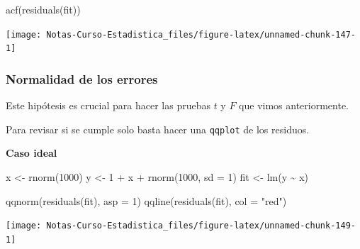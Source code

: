 \documentclass[
  12pt,
]{book}
\newenvironment{Shaded}{\begin{snugshade}}{\end{snugshade}}
\newcommand{\AttributeTok}[1]{\textcolor[rgb]{0.77,0.63,0.00}{#1}}
\newcommand{\DecValTok}[1]{\textcolor[rgb]{0.00,0.00,0.81}{#1}}
\newcommand{\FunctionTok}[1]{\textcolor[rgb]{0.00,0.00,0.00}{#1}}
\newcommand{\NormalTok}[1]{#1}
\newcommand{\OtherTok}[1]{\textcolor[rgb]{0.56,0.35,0.01}{#1}}
\newcommand{\SpecialCharTok}[1]{\textcolor[rgb]{0.00,0.00,0.00}{#1}}
\newcommand{\StringTok}[1]{\textcolor[rgb]{0.31,0.60,0.02}{#1}}
\theoremstyle{definition}
\theoremstyle{definition}
\theoremstyle{definition}
\theoremstyle{definition}
\theoremstyle{remark}
\begin{document}
\begin{Shaded}
\begin{Highlighting}[]
\FunctionTok{acf}\NormalTok{(}\FunctionTok{residuals}\NormalTok{(fit))}
\end{Highlighting}
\end{Shaded}

\begin{center}\texttt{[image: Notas-Curso-Estadistica\_files/figure-latex/unnamed-chunk-147-1]} \end{center}

\hypertarget{normalidad-de-los-errores}{%
\subsubsection{Normalidad de los errores}\label{normalidad-de-los-errores}}

Este hipótesis es crucial para hacer las pruebas \(t\) y \(F\) que vimos anteriormente.

Para revisar si se cumple solo basta hacer una \texttt{qqplot} de los residuos.

\textbf{Caso ideal}

\begin{Shaded}
\begin{Highlighting}[]
\NormalTok{x }\OtherTok{\textless{}{-}} \FunctionTok{rnorm}\NormalTok{(}\DecValTok{1000}\NormalTok{)}
\NormalTok{y }\OtherTok{\textless{}{-}} \DecValTok{1} \SpecialCharTok{+}\NormalTok{ x }\SpecialCharTok{+} \FunctionTok{rnorm}\NormalTok{(}\DecValTok{1000}\NormalTok{, }\AttributeTok{sd =} \DecValTok{1}\NormalTok{)}
\NormalTok{fit }\OtherTok{\textless{}{-}} \FunctionTok{lm}\NormalTok{(y }\SpecialCharTok{\textasciitilde{}}\NormalTok{ x)}
\end{Highlighting}
\end{Shaded}

\begin{Shaded}
\begin{Highlighting}[]
\FunctionTok{qqnorm}\NormalTok{(}\FunctionTok{residuals}\NormalTok{(fit), }\AttributeTok{asp =} \DecValTok{1}\NormalTok{)}
\FunctionTok{qqline}\NormalTok{(}\FunctionTok{residuals}\NormalTok{(fit), }\AttributeTok{col =} \StringTok{"red"}\NormalTok{)}
\end{Highlighting}
\end{Shaded}

\begin{center}\texttt{[image: Notas-Curso-Estadistica\_files/figure-latex/unnamed-chunk-149-1]} \end{center}
\end{document}
